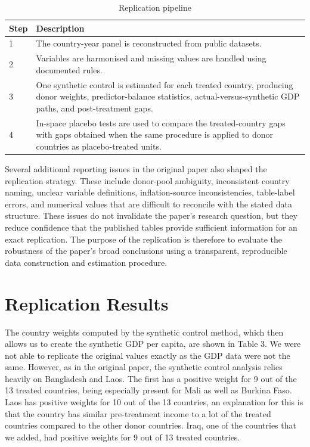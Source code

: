 \documentclass[a4paper]{article}
\begin{document}
\begin{table}[htbp]
\centering
\caption{Replication pipeline}
\label{tab:replication_pipeline}
\begin{tabular}{p{1.2cm}p{11.5cm}}
\toprule
Step & Description \\
\midrule
1 & The country-year panel is reconstructed from public datasets. \\
2 & Variables are harmonised and missing values are handled using documented rules. \\
3 & One synthetic control is estimated for each treated country, producing donor weights, predictor-balance statistics, actual-versus-synthetic GDP paths, and post-treatment gaps. \\
4 & In-space placebo tests are used to compare the treated-country gaps with gaps obtained when the same procedure is applied to donor countries as placebo-treated units. \\
\bottomrule
\end{tabular}
\end{table}

Several additional reporting issues in the original paper also shaped the replication strategy. These include donor-pool ambiguity, inconsistent country naming, unclear variable definitions, inflation-source inconsistencies, table-label errors, and numerical values that are difficult to reconcile with the stated data structure. These issues do not invalidate the paper's research question, but they reduce confidence that the published tables provide sufficient information for an exact replication. The purpose of the replication is therefore to evaluate the robustness of the paper's broad conclusions using a transparent, reproducible data construction and estimation procedure.


\section{Replication Results}

The  country weights computed by the synthetic control method, which then allows us to create the synthetic GDP per capita, are shown in Table 3. We were not able to replicate the original values exactly as the GDP data were not the same. However, as in the original paper, the synthetic control analysis relies heavily on Bangladesh and Laos. The first has a positive weight for 9 out of the 13 treated countries, being especially present for Mali as well as Burkina Faso. Laos has positive weights for 10 out of the 13 countries, an explanation for this is that the country has similar pre-treatment income to a lot of the treated countries compared to the other donor countries. Iraq, one of the countries that we added, had positive weights for 9 out of 13 treated countries. 
\end{document}
